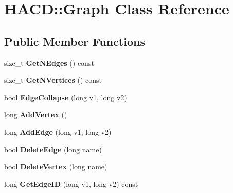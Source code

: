 \hypertarget{class_h_a_c_d_1_1_graph}{\section{H\+A\+C\+D\+:\+:Graph Class Reference}
\label{class_h_a_c_d_1_1_graph}
}
\subsection*{Public Member Functions}
\begin{DoxyCompactItemize}
\item 
\hypertarget{class_h_a_c_d_1_1_graph_aff12e58ade1dbbad5d511c29309fab68}{size\+\_\+t {\bfseries Get\+N\+Edges} () const }\label{class_h_a_c_d_1_1_graph_aff12e58ade1dbbad5d511c29309fab68}

\item 
\hypertarget{class_h_a_c_d_1_1_graph_a170da164967427bcbe8948740eb39bbe}{size\+\_\+t {\bfseries Get\+N\+Vertices} () const }\label{class_h_a_c_d_1_1_graph_a170da164967427bcbe8948740eb39bbe}

\item 
\hypertarget{class_h_a_c_d_1_1_graph_acecb11031d9404fcfe62d6c2d3323428}{bool {\bfseries Edge\+Collapse} (long v1, long v2)}\label{class_h_a_c_d_1_1_graph_acecb11031d9404fcfe62d6c2d3323428}

\item 
\hypertarget{class_h_a_c_d_1_1_graph_ac387d4c1647fdfe958649773a6766c42}{long {\bfseries Add\+Vertex} ()}\label{class_h_a_c_d_1_1_graph_ac387d4c1647fdfe958649773a6766c42}

\item 
\hypertarget{class_h_a_c_d_1_1_graph_a0d079952cce618a81fb46c13910d0109}{long {\bfseries Add\+Edge} (long v1, long v2)}\label{class_h_a_c_d_1_1_graph_a0d079952cce618a81fb46c13910d0109}

\item 
\hypertarget{class_h_a_c_d_1_1_graph_aad2bfb7cdd25accd0895435c3c357447}{bool {\bfseries Delete\+Edge} (long name)}\label{class_h_a_c_d_1_1_graph_aad2bfb7cdd25accd0895435c3c357447}

\item 
\hypertarget{class_h_a_c_d_1_1_graph_a68da8b8b89ffe0d7398dbb1cf5e29745}{bool {\bfseries Delete\+Vertex} (long name)}\label{class_h_a_c_d_1_1_graph_a68da8b8b89ffe0d7398dbb1cf5e29745}

\item 
\hypertarget{class_h_a_c_d_1_1_graph_a60f3806e9eb15792e1bb4c9ea4742b9f}{long {\bfseries Get\+Edge\+I\+D} (long v1, long v2) const }\label{class_h_a_c_d_1_1_graph_a60f3806e9eb15792e1bb4c9ea4742b9f}


\end{DoxyCompactItemize}
